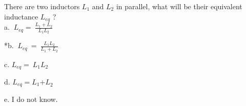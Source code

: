 
There are two inductors \( L_{1} \) and \( L_{2} \) in
parallel, what will be their equivalent inductance \( L_{eq} \) ?\\

a. \(\ L_{eq} = \ \frac{L_{1} + L_{2}}{L_{1}L_{2}} \)

*b. \(\ L_{eq}\  = \ \frac{L_{1}L_{2}}{L_{1} + L_{2}} \)

c. \( L_{eq} = \ L_{1}L_{2} \)

d. \( L_{eq} = L_{1}{+ L}_{2} \)

e. I do not know.\\
